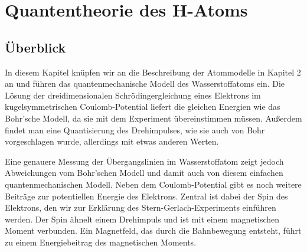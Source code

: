 \renewcommand{\lastmod}{7. November 2024}
\renewcommand{\chapterauthors}{Markus Lippitz}

\chapter{Quantentheorie des H-Atoms}









\section{Überblick}

In diesem Kapitel knüpfen wir an die Beschreibung der Atommodelle in Kapitel 2 an und führen das quantenmechanische Modell des Wasserstoffatoms ein. Die Lösung der dreidimensionalen Schrödingergleichung eines Elektrons im kugelsymmetrischen Coulomb-Potential liefert die gleichen Energien wie das Bohr'sche Modell, da sie mit dem Experiment übereinstimmen müssen. Außerdem findet man eine Quantisierung des Drehimpulses, wie sie auch von Bohr vorgeschlagen wurde, allerdings mit etwas anderen Werten.

Eine genauere Messung der Übergangslinien im Wasserstoffatom zeigt jedoch Abweichungen vom Bohr'schen Modell und damit auch von diesem einfachen quantenmechanischen Modell. Neben dem Coulomb-Potential gibt es noch weitere Beiträge zur potentiellen Energie des Elektrons. Zentral ist dabei der Spin des Elektrons, den wir zur Erklärung des Stern-Gerlach-Experiments einführen werden. Der Spin ähnelt einem Drehimpuls und ist mit einem magnetischen Moment verbunden. Ein Magnetfeld, das durch die Bahnbewegung entsteht, führt zu einem Energiebeitrag des magnetischen Moments.

